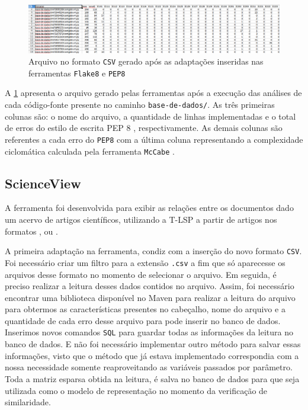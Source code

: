 			\begin{figure}[h]
				\centering
				\includegraphics[width=1\linewidth]{imagem/arquivoCSV}
				\caption{Arquivo no formato \texttt{CSV} gerado após as adaptações inseridas nas ferramentas \texttt{Flake8} e \texttt{PEP8}}
				\label{fig:arquivoCSV}
			\end{figure}
			
			A \cref{fig:arquivoCSV} apresenta o arquivo gerado pelas ferramentas após a
			execução das análises de cada código-fonte presente no caminho \texttt{base-de-dados/}.
			As três primeiras colunas são: o nome do arquivo, a quantidade de linhas implementadas
			e o total de erros do estilo de escrita PEP 8 \cite{van2001pep}, respectivamente. As
			demais colunas são referentes a cada erro do \texttt{PEP8} \cite{pep8} com a última
			coluna representando a complexidade ciclomática calculada pela ferramenta
			\texttt{McCabe} \cite{mccabe}.


		\subsection{ScienceView}
		\label{sec:scienceView}
		
		A ferramenta  \cite{Alencar} foi desenvolvida para exibir
		as relações entre os documentos dado um acervo de artigos científicos, utilizando
		a \acs{T-LSP} a partir de artigos nos formatos , 
		ou .
		
		A primeira adaptação na ferramenta, condiz com a inserção do novo formato \texttt{CSV}.
		Foi necessário criar um filtro para a extensão \texttt{.csv} a fim que só aparecesse
		os arquivos desse formato no momento de selecionar o arquivo. Em seguida, é preciso
		realizar a leitura desses dados contidos no arquivo. Assim, foi necessário encontrar
		uma biblioteca disponível no Maven para realizar a leitura do arquivo para obtermos
		as características presentes no cabeçalho, nome do arquivo e a quantidade de cada
		erro desse arquivo para pode inserir no banco de dados. Inserimos novos comandos
		\texttt{SQL} para guardar todas as informações da leitura no banco de dados. E não
		foi necessário implementar outro método para salvar essas informações, visto que o
		método que já estava implementado correspondia com a nossa necessidade somente
		reaproveitando as variáveis passados por parâmetro. Toda a matriz esparsa obtida
		na leitura, é salva no banco de dados para que seja utilizada como o modelo de
		representação no momento da verificação de similaridade.
		
